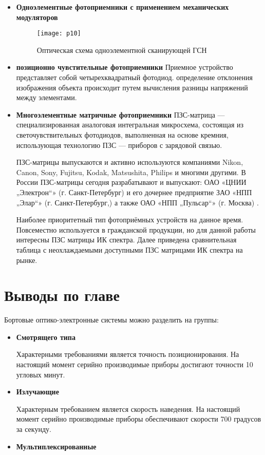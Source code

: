 \begin{itemize}
	\item \textbf{Одноэлементные фотоприемники с применением механических модуляторов}
	\begin{figure}[ht]
		\centering
		\texttt{[image: p10]} 
		\caption{Оптическая схема одноэлементной сканирующей ГСН  }
		\label{fig:p10}
	\end{figure}
	\item \textbf{позиционно чувстительные фотоприемники}
	Приемное устройство представляет собой четырехквадратный фотодиод. определение отклонения изображения объекта происходит путем вычисления разницы напряжений между элементами. 
	
	
	\item \textbf{Многоэлементные матричные фотоприемники}
	ПЗС-матрица — специализированная аналоговая интегральная микросхема, состоящая из светочувствительных фотодиодов, выполненная на основе кремния, использующая технологию ПЗС — приборов с зарядовой связью.
	
	ПЗС-матрицы выпускаются и активно используются компаниями Nikon, Canon, Sony, Fujitsu, Kodak, Matsushita, Philips и многими другими. В России ПЗС-матрицы сегодня разрабатывают и выпускают: ОАО «ЦНИИ „Электрон“» (г. Санкт-Петербург) и его дочернее предприятие ЗАО «НПП „Элар“» (г. Санкт-Петербург,) а также ОАО «НПП „Пульсар“» (г. Москва) \cite[]{CCD}.
	
	Наиболее приоритетный тип фотоприёмных устройств на данное время. Повсеместно используется в гражданской продукции, но для данной работы интересны ПЗС матрицы ИК спектра. Далее приведена сравнительная таблица с неохлаждаемыми доступными ПЗС матрицами ИК спектра на рынке.
	
\end{itemize}


\section{Выводы по главе} \label{sec:ch1/sec4-}

Бортовые оптико-электронные системы можно разделить на группы:
\begin{itemize}
	\item \textbf{Смотрящего типа}
	
	Характерными требованиями является точность позиционирования. На настоящий момент серийно производимые приборы достигают точности 10 угловых минут.
	
		
	\item \textbf{Излучающие}
	
	Характерным требованием является скорость наведения. На настоящий момент серийно производимые приборы обеспечивают скорости 700 градусов за секунду.
	\item \textbf{Мультиплексированные}
	
	
\end{itemize}

